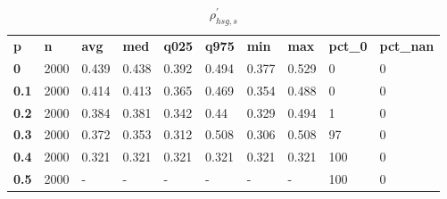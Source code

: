 \begin{table}[h]
 \centering 
\footnotesize
\caption{$\rho_{hsg,s}^\prime $}
\label{tab:alphahsgs}
\begin{tabular}[h]{| l l l l l l l l l l|
    } \hline
\textbf{ p} & \textbf{ n} & \textbf{ avg} & \textbf{ med} & \textbf{ q025} & \textbf{ q975} & \textbf{ min} & \textbf{ max} & \textbf{ pct\_0} & \textbf{ pct\_nan}
           \\
  \textbf{  0} & 2000 & 0.439 & 0.438 & 0.392 & 0.494 & 0.377 & 0.529 &   0 & 0
           \\
  \textbf{0.1} & 2000 & 0.414 & 0.413 & 0.365 & 0.469 & 0.354 & 0.488 &   0 & 0
           \\
  \textbf{0.2} & 2000 & 0.384 & 0.381 & 0.342 &  0.44 & 0.329 & 0.494 &   1 & 0
           \\
  \textbf{0.3} & 2000 & 0.372 & 0.353 & 0.312 & 0.508 & 0.306 & 0.508 &  97 & 0
           \\
  \textbf{0.4} & 2000 & 0.321 & 0.321 & 0.321 & 0.321 & 0.321 & 0.321 & 100 & 0
           \\
  \textbf{0.5} & 2000 & - & - & - & - & - & - & 100 & 0
           \\
 \hline \end{tabular}
 \end{table}
